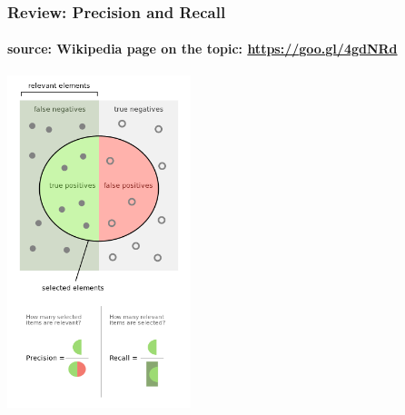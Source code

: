 \documentclass{beamer}
\begin{document}
\begin{frame}
\frametitle{Review: Precision and Recall}
\framesubtitle{source: Wikipedia page on the topic: \url{https://goo.gl/4gdNRd}}
\begin{center}
\includegraphics[width=0.4\textwidth]{Precisionrecall.png}
\end{center}
\end{frame}
\end{document}
